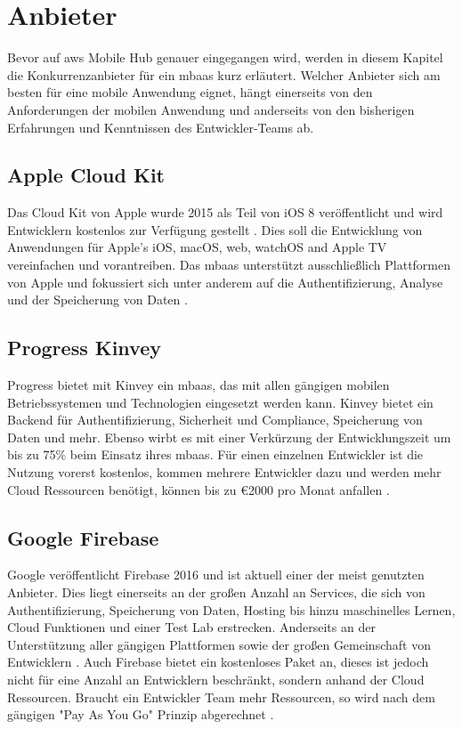 \section{Anbieter}
Bevor auf \gls{aws} Mobile Hub genauer eingegangen wird, werden in diesem Kapitel die Konkurrenzanbieter für ein \gls{mbaas} kurz erläutert. Welcher Anbieter sich am besten für eine mobile Anwendung eignet, hängt einerseits von den Anforderungen der mobilen Anwendung und anderseits von den bisherigen Erfahrungen und Kenntnissen des Entwickler-Teams ab.

\subsection{Apple Cloud Kit}
Das Cloud Kit von Apple wurde 2015 als Teil von iOS 8 veröffentlicht und wird Entwicklern kostenlos zur Verfügung gestellt \cite{techbeacon}. Dies soll die Entwicklung von Anwendungen für Apple's iOS, macOS, web, watchOS and Apple TV vereinfachen und vorantreiben. Das \gls{mbaas} unterstützt ausschließlich Plattformen von Apple und fokussiert sich unter anderem auf die Authentifizierung, Analyse und der Speicherung von Daten \cite{applecloudkit}.

\subsection{Progress Kinvey}
Progress bietet mit Kinvey ein \gls{mbaas}, das mit allen gängigen mobilen Betriebssystemen und Technologien eingesetzt werden kann. Kinvey bietet ein Backend für Authentifizierung, Sicherheit und Compliance, Speicherung von Daten und mehr. Ebenso wirbt es mit einer Verkürzung der Entwicklungszeit um bis zu 75\% beim Einsatz ihres \gls{mbaas}. Für einen einzelnen Entwickler ist die Nutzung vorerst kostenlos, kommen mehrere Entwickler dazu und werden mehr Cloud Ressourcen benötigt, können bis zu \euro{2000} pro Monat anfallen \cite{progresskinvey}.

\subsection{Google Firebase}
Google veröffentlicht Firebase 2016 und ist aktuell einer der meist genutzten Anbieter. Dies liegt einerseits an der großen Anzahl an Services, die sich von Authentifizierung, Speicherung von Daten, Hosting bis hinzu maschinelles Lernen, Cloud Funktionen und einer Test Lab erstrecken. Anderseits an der Unterstützung aller gängigen Plattformen sowie der großen Gemeinschaft von Entwicklern \cite{techbeacon}. Auch Firebase bietet ein kostenloses Paket an, dieses ist jedoch nicht für eine Anzahl an Entwicklern beschränkt, sondern anhand der Cloud Ressourcen. Braucht ein Entwickler Team mehr Ressourcen, so wird nach dem gängigen "Pay As You Go" Prinzip abgerechnet \cite{googlefirebase}.

